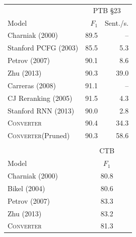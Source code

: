 \documentclass[11pt,letterpaper]{article}
\newcommand{\ParseName}{\textsc{Converter}\xspace}
\begin{document}
\begin{table}
  \centering
  \small

  \begin{tabular}{lrr}
    \toprule
    & \multicolumn{2}{c}{PTB \S 23} \\


    Model & $F_1$ & Sent./s.\\
    \midrule

    Charniak (2000)     &   89.5 &  --  \\
    Stanford PCFG (2003)     &   85.5 & 5.3  \\
    Petrov (2007)       &   90.1 & 8.6  \\
    Zhu (2013)           &   90.3 & 39.0 \\
    Carreras (2008)      &   91.1 & --    \\
    \midrule
    CJ Reranking (2005)      &   91.5 & 4.3  \\
    Stanford RNN (2013)       &   90.0 & 2.8  \\ 
    \midrule
    \ParseName        &   90.4 & 34.3 \\
    \ParseName(Pruned)        &   90.3 & 58.6 \\
    \bottomrule
    \\

    \toprule
     & \multicolumn{2}{c}{CTB} \\

    Model & \multicolumn{2}{c}{$F_1$}  \\
    \midrule
    Charniak (2000)     &   \multicolumn{2}{c}{80.8}   \\
    Bikel (2004)     &    \multicolumn{2}{c}{80.6} \\
    Petrov (2007)       &   \multicolumn{2}{c}{83.3}  \\
    Zhu (2013)           &   \multicolumn{2}{c}{83.2} \\
    \midrule
    \ParseName        &   \multicolumn{2}{c}{81.3} \\
    \bottomrule
  \end{tabular}



\end{table}
\end{document}
